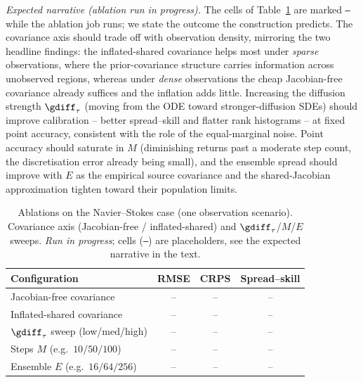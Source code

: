 \emph{Expected narrative (ablation run in progress).} The cells of Table~\ref{tab:ablation} are marked \texttt{--} while the ablation job runs; we state the outcome the construction predicts. The covariance axis should trade off with observation density, mirroring the two headline findings: the inflated-shared covariance helps most under \emph{sparse} observations, where the prior-covariance structure carries information across unobserved regions, whereas under \emph{dense} observations the cheap Jacobian-free covariance already suffices and the inflation adds little. Increasing the diffusion strength $\gdiff_\tau$ (moving from the ODE toward stronger-diffusion SDEs) should improve calibration -- better spread--skill and flatter rank histograms -- at fixed point accuracy, consistent with the role of the equal-marginal noise. Point accuracy should saturate in $M$ (diminishing returns past a moderate step count, the discretisation error already being small), and the ensemble spread should improve with $E$ as the empirical source covariance and the shared-Jacobian approximation tighten toward their population limits.

\begin{table}[ht]
    \centering
    \small
    \caption{Ablations on the Navier--Stokes case (one observation scenario). Covariance axis (Jacobian-free / inflated-shared) and $\gdiff_\tau$/$M$/$E$ sweeps. \emph{Run in progress}; cells (\texttt{--}) are placeholders, see the expected narrative in the text.}
    \label{tab:ablation}
    \begin{tabular}{l|ccc}
        \toprule
        Configuration & RMSE & CRPS & Spread--skill \\
        \midrule
        Jacobian-free covariance               & -- & -- & -- \\
        Inflated-shared covariance             & -- & -- & -- \\
        \midrule
        $\gdiff_\tau$ sweep (low/med/high) & -- & -- & -- \\
        Steps $M$ (e.g.\ $10/50/100$)      & -- & -- & -- \\
        Ensemble $E$ (e.g.\ $16/64/256$)   & -- & -- & -- \\
        \bottomrule
    \end{tabular}
\end{table}

